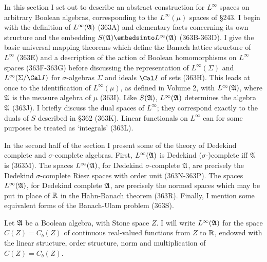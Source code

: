 
\def\chaptername{Function spaces}
\def\sectionname{$L^{\infty}$}


In this section I set out to describe an abstract construction for
$L^{\infty}$ spaces on arbitrary Boolean algebras,
corresponding to the $L^{\infty}(\mu)$ spaces of \S243.   I begin with
the definition of $L^{\infty}(\frak A)$ (363A) and elementary facts
concerning its own structure and the embedding
$S(\frak A)\embedsinto L^{\infty}(\frak A)$ (363B-363D).   I give the basic universal mapping
theorems which define the Banach lattice structure of $L^{\infty}$
(363E) and a description of the action of Boolean homomorphisms on
$L^{\infty}$ spaces (363F-363G) before discussing the representation of
$L^{\infty}(\Sigma)$ and $L^{\infty}(\Sigma/\Cal I)$ for
$\sigma$-algebras $\Sigma$
and ideals $\Cal I$ of sets (363H).   This leads at once to the
identification of
$L^{\infty}(\mu)$, as defined in Volume 2, with $L^{\infty}(\frak A)$,
where $\frak A$ is the measure algebra of $\mu$ (363I).   Like
$S(\frak A)$, $L^{\infty}(\frak A)$ determines the algebra $\frak A$
(363J).   I
briefly discuss the dual spaces of $L^{\infty}$;  they correspond
exactly to the duals of $S$ described in \S362 (363K).   Linear
functionals on $L^{\infty}$ can for some purposes be treated as
`integrals' (363L).

In the second half of the section I present some of the theory of
Dedekind complete and
$\sigma$-complete algebras.   First, $L^{\infty}(\frak A)$ is Dedekind
($\sigma$-\nobreak)complete iff $\frak A$ is (363M).   The spaces
$L^{\infty}(\frak A)$, for Dedekind $\sigma$-complete $\frak A$, are
precisely the Dedekind $\sigma$-complete Riesz spaces with order unit
(363N-363P).   The spaces $L^{\infty}(\frak A)$, for Dedekind
complete $\frak A$, are precisely the normed spaces which may be put in
place of $\Bbb R$ in the Hahn-Banach theorem (363R).   Finally, I
mention some equivalent forms of the Banach-Ulam problem (363S).

 Let $\frak A$ be a Boolean algebra, with Stone
space $Z$.   I will write $L^{\infty}(\frak A)$ for the space
$C(Z)=C_b(Z)$ of
continuous real-valued functions from $Z$ to $\Bbb R$, endowed with the
linear structure, order structure, norm and multiplication of
$C(Z)=C_b(Z)$.   

